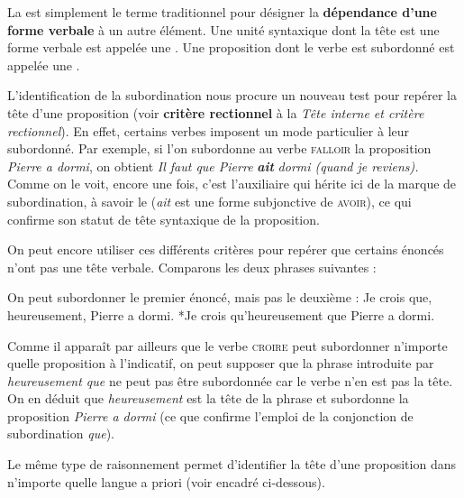 \begin{styleLivreImportant}
La  est simplement le terme traditionnel pour désigner la \textbf{dépendance d’une} \textbf{forme verbale} à un autre élément. Une unité syntaxique dont la tête est une forme verbale est appelée une . Une proposition dont le verbe est subordonné est appelée une .
\end{styleLivreImportant}

L’identification de la subordination nous procure un nouveau test pour repérer la tête d’une proposition (voir \textbf{critère rectionnel} à la  \textit{Tête interne et critère rectionnel}). En effet, certains verbes imposent un mode particulier à leur subordonné. Par exemple, si l’on subordonne au verbe \textsc{falloir} la proposition \textit{Pierre a dormi}, on obtient \textit{Il faut que Pierre} \textbf{\textit{ait}} \textit{dormi (quand je reviens).} Comme on le voit, encore une fois, c’est l’auxiliaire qui hérite ici de la marque de subordination, à savoir le  (\textit{ait} est une forme subjonctive de \textsc{avoir}), ce qui confirme son statut de tête syntaxique de la proposition.

On peut encore utiliser ces différents critères pour repérer que certains énoncés n’ont pas une tête verbale. Comparons les deux phrases suivantes :

\z
{}
\z

On peut subordonner le premier énoncé, mais pas le deuxième :
\ea
{Je crois que, heureusement, Pierre a dormi}.
\z
\ea
*{Je crois qu’heureusement que Pierre a dormi}.
\z

Comme il apparaît par ailleurs que le verbe \textsc{croire} peut subordonner n’importe quelle proposition à l’indicatif, on peut supposer que la phrase introduite par \textit{heureusement que} ne peut pas être subordonnée car le verbe n’en est pas la tête. On en déduit que \textit{heureusement} est la tête de la phrase et subordonne la proposition \textit{Pierre a dormi} (ce que confirme l’emploi de la conjonction de subordination \textit{que}).

Le même type de raisonnement permet d’identifier la tête d’une proposition dans n’importe quelle langue a priori (voir encadré ci-dessous).

